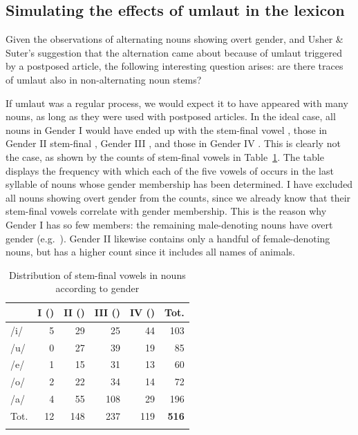 \documentclass[output=collectionpaper]{langsci/langscibook}
\begin{document}
\subsection{Simulating the effects of umlaut in the lexicon}
Given the observations of alternating nouns showing overt gender, and Usher \& Suter's suggestion that the alternation came about because of umlaut triggered by a postposed article, the following interesting question arises: are there traces of umlaut also in non-alternating noun stems?

If umlaut was a regular process, we would expect it to have appeared with many nouns, as long as they were used with postposed articles. In the ideal case, all nouns in Gender I would have ended up with the stem-final vowel , those in Gender II stem-final , Gender III , and those in Gender IV . This is clearly not the case, as shown by the counts of stem-final vowels in Table~\ref{table:Bruno:numbers}. The table displays the frequency with which each of the five vowels of  occurs in the last syllable of nouns whose gender membership has been determined. I have excluded all nouns showing overt gender from the counts, since we already know that their stem-final vowels correlate with gender membership. This is the reason why Gender I has so few members: the remaining male-denoting nouns have overt gender (e.g.\ ). Gender II likewise contains only a handful of female-denoting nouns, but has a higher count since it includes all names of animals.


\begin{table}
\centering
\begin{tabular}{lrrrrr}
\lsptoprule
	& I (\mar{e})	& II (\mar{u})	& III (\mar{a})	& IV (\mar{i}) & Tot.\\
\midrule
/i/	&5	&29	&25	&\cellcolor{lsLightGray}44 & 103\\
/u/	&0	&\cellcolor{lsLightGray}27	&39	&19 & 85\\
/e/	&1	&15	&31	&13 & 60\\
/o/	&2	&22	&34	&14 & 72\\
/a/	&4	&55	&\cellcolor{lsLightGray}108	&29 & 196\\
\midrule
Tot.	&12	&148	&237	&119 & \textbf{516}\\
\lspbottomrule
\end{tabular}
\caption{Distribution of stem-final vowels in nouns according to gender}
\label{table:Bruno:numbers}
\end{table}
\end{document}
